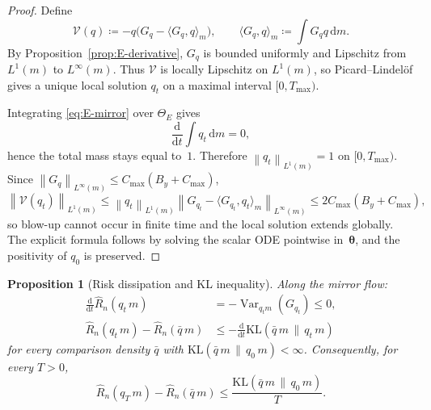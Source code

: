 \documentclass[11pt,a4paper]{article}
\newtheorem{proposition}[theorem]{Proposition}
\theoremstyle{definition}
\theoremstyle{remark}
\newcommand{\vtheta}{\boldsymbol{\theta}}
\newcommand{\dd}{\mathrm{d}}
\newcommand{\norm}[1]{\left\|#1\right\|}
\begin{document}
\begin{proof}
  Define
  \[
    \mathcal V(q)
    \coloneqq
    -q\bigl(G_q-\langle G_q,q\rangle_m\bigr),
    \qquad
    \langle G_q,q\rangle_m
    \coloneqq
    \int G_q q\,\dd m.
  \]
  By Proposition~\ref{prop:E-derivative},
  \(G_q\) is bounded uniformly and Lipschitz from
  \(L^1(m)\) to \(L^\infty(m)\). Thus
  \(\mathcal V\) is locally Lipschitz on
  \(L^1(m)\), so Picard--Lindel\"of gives a
  unique local solution \(q_t\) on a maximal
  interval \([0,T_{\max})\).

  Integrating \eqref{eq:E-mirror} over
  \(\Theta_E\) gives
  \[
    \frac{\dd}{\dd t}\int q_t\,\dd m = 0,
  \]
  hence the total mass stays equal to~\(1\).
  Therefore \(\norm{q_t}_{L^1(m)}=1\) on
  \([0,T_{\max})\). Since
  \(\norm{G_q}_{L^\infty(m)}
  \le C_{\max}(B_y+C_{\max})\),
  \[
    \norm{\mathcal V(q_t)}_{L^1(m)}
    \le
    \norm{q_t}_{L^1(m)}
    \norm{
      G_{q_t}-\langle G_{q_t},q_t\rangle_m
    }_{L^\infty(m)}
    \le 2C_{\max}(B_y+C_{\max}),
  \]
  so blow-up cannot occur in finite time and the
  local solution extends globally.
  The explicit formula follows by solving the
  scalar ODE pointwise in~\(\vtheta\), and the
  positivity of \(q_0\) is preserved.
\end{proof}

\begin{proposition}[Risk dissipation and KL inequality]
  \label{prop:E-kl}
  Along the mirror flow:
  \begin{align}
    \frac{\dd}{\dd t}\hat R_n(q_t\,m)
    &=
    -\operatorname{Var}_{q_t m}(G_{q_t})
    \le 0,
    \label{eq:app-dissipation}\\
    \hat R_n(q_t\,m)-\hat R_n(\bar q\,m)
    &\le
    -\frac{\dd}{\dd t}
    \mathrm{KL}(\bar q\,m \,\|\, q_t\,m)
    \label{eq:app-kl}
  \end{align}
  for every comparison density \(\bar q\) with
  \(\mathrm{KL}(\bar q\,m \,\|\, q_0\,m)<\infty\).
  Consequently, for every \(T>0\),
  \begin{equation}
    \hat R_n(q_T\,m)-\hat R_n(\bar q\,m)
    \le
    \frac{
      \mathrm{KL}(\bar q\,m \,\|\, q_0\,m)
    }{T}.
    \label{eq:app-ergodic}
  \end{equation}
\end{proposition}
\end{document}
